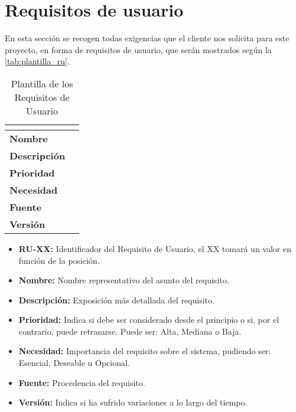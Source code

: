 \section{Requisitos de usuario}
En esta sección se recogen todas exigencias que el cliente nos solicita para este proyecto, en forma de requisitos de usuario, que serán mostrados según la \autoref{tab:plantilla_ru}.
\begin{table}[H]
	\centering
	\caption{Plantilla de los Requisitos de Usuario}
	\label{tab:plantilla_ru}
	\begin{tabular}{|l|p{}|}
		\hline
		\multicolumn{2}{|c|}{\cellcolor[HTML]{BFBFBF}{\color[HTML]{000000} \textbf{RU-XX}}} \\ \hline
		\textbf{Nombre}      &   \\ \hline
		\textbf{Descripción} &   \\ \hline
		\textbf{Prioridad}   &   \\ \hline
		\textbf{Necesidad}   &   \\ \hline
		\textbf{Fuente}      &   \\ \hline
		\textbf{Versión}     &   \\ \hline
	\end{tabular}
\end{table}
\begin{itemize}
	\item \textbf{RU-XX:} Identificador del Requisito de Usuario, el XX tomará un valor en función de la posición.
	\item \textbf{Nombre:} Nombre representativo del asunto del requisito.
	\item \textbf{Descripción:} Exposición más detallada del requisito.
	\item \textbf{Prioridad:} Indica si debe ser considerado desde el principio o si, por el contrario, puede retrasarse. Puede ser: Alta, Mediana o Baja.
	\item \textbf{Necesidad:} Importancia del requisito sobre el sistema, pudiendo ser: Esencial, Deseable u Opcional.
	\item \textbf{Fuente:} Procedencia del requisito.
	\item \textbf{Versión:} Indica si ha sufrido variaciones a lo largo del tiempo.
\end{itemize}

